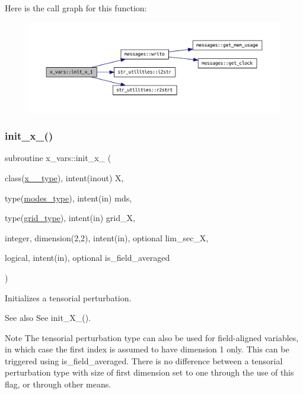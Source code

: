 Here is the call graph for this function\+:\nopagebreak
\begin{figure}[H]
\begin{center}
\leavevmode
\includegraphics[width=350pt]{namespacex__vars_a327c74a0fa8c50aa2ed812062bd82436_cgraph}
\end{center}
\end{figure}
\mbox{\label{namespacex__vars_a5cb61bfd7fbdae7bae2ec10b63160d74}} 
\subsubsection{\texorpdfstring{init\+\_\+x\+\_()}{init\_x\_2()}}
{\footnotesize\ttfamily subroutine x\+\_\+vars\+::init\+\_\+x\+\_ (\begin{DoxyParamCaption}\item[{class(\hyperlink{structx__vars_1_1x__2__type}{x\+\_\+2\+\_\+type}), intent(inout)}]{X,  }\item[{type(\hyperlink{structx__vars_1_1modes__type}{modes\+\_\+type}), intent(in)}]{mds,  }\item[{type(\hyperlink{structgrid__vars_1_1grid__type}{grid\+\_\+type}), intent(in)}]{grid\+\_\+X,  }\item[{integer, dimension(2,2), intent(in), optional}]{lim\+\_\+sec\+\_\+X,  }\item[{logical, intent(in), optional}]{is\+\_\+field\+\_\+averaged }\end{DoxyParamCaption})}



Initializes a tensorial perturbation. 

\begin{DoxySeeAlso}{See also}
See init\+\_\+\+X\+\_().
\end{DoxySeeAlso}
\begin{DoxyNote}{Note}
The tensorial perturbation type can also be used for field-\/aligned variables, in which case the first index is assumed to have dimension 1 only. This can be triggered using {\ttfamily is\+\_\+field\+\_\+averaged}. There is no difference between a tensorial perturbation type with size of first dimension set to one through the use of this flag, or through other means.
\end{DoxyNote}

